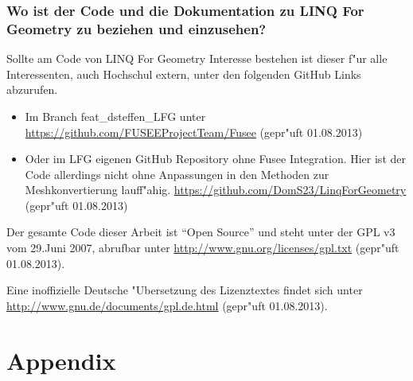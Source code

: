 \documentclass[pagesize, paper=a4, fontsize=12pt,titlepage=true, headings=small, headnosepline, abstractoff, liststotoc, nochapterprefix, plainheadsepline]{scrreprt}
\newcommand{\LFGS}{LINQ For Geometry }
\begin{document}
\newpage
\section {Wo ist der Code und die Dokumentation zu \LFGS zu beziehen und einzusehen?}
	Sollte am Code von \LFGS Interesse bestehen ist dieser f"ur alle Interessenten, auch Hochschul extern, unter den folgenden GitHub Links abzurufen.
\begin{itemize}
\item Im Branch feat\_dsteffen\_LFG unter \url{https://github.com/FUSEEProjectTeam/Fusee} (gepr"uft 01.08.2013)
\item Oder im LFG eigenen GitHub Repository ohne Fusee Integration. Hier ist der Code allerdings nicht ohne Anpassungen in den Methoden zur Meshkonvertierung lauff"ahig. \url{https://github.com/DomS23/LinqForGeometry} (gepr"uft 01.08.2013)
\end{itemize}

Der gesamte Code dieser Arbeit ist "`Open Source"' und steht unter der GPL v3 vom 29.Juni 2007, abrufbar unter \url{http://www.gnu.org/licenses/gpl.txt} (gepr"uft 01.08.2013).
\newline

Eine inoffizielle Deutsche "Ubersetzung des Lizenztextes findet sich unter \url{http://www.gnu.de/documents/gpl.de.html} (gepr"uft 01.08.2013).



\part*{Appendix}


\lstlistoflistings

\listoftables
\end{document}
